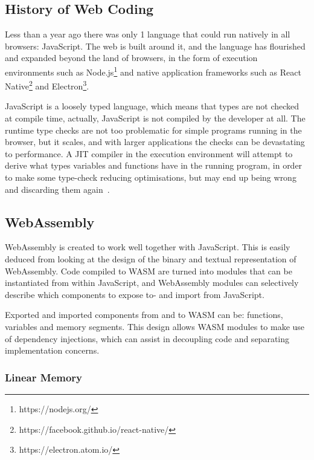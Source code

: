 \documentclass[a4paper]{article}
\begin{document}

\subsection{History of Web Coding}
\label{sec:problem-analysis:history}
Less than a year ago there was only 1 language that could run natively in all browsers: JavaScript. The web is built around it, and the language has flourished and expanded beyond the land of browsers, in the form of execution environments such as Node.js\footnote{https://nodejs.org/} and native application frameworks such as React Native\footnote{https://facebook.github.io/react-native/} and Electron\footnote{https://electron.atom.io/}.

JavaScript is a loosely typed language, which means that types are not checked at compile time, actually, JavaScript is not compiled by the developer at all. The runtime type checks are not too problematic for simple programs running in the browser, but it scales, and with larger applications the checks can be devastating to performance. A JIT compiler in the execution environment will attempt to derive what types variables and functions have in the running program, in order to make some type-check reducing optimisations, but may end up being wrong and discarding them again~\cite{video:thompson-js-perf-v8-and-wasm}. %

\subsection{WebAssembly}
\label{sec:problem-analysis:webassembly}
WebAssembly is created to work well together with JavaScript. This is easily deduced from looking at the design of the binary and textual representation of WebAssembly. Code compiled to WASM are turned into modules that can be instantiated from within JavaScript, and WebAssembly modules can selectively describe which components to expose to- and import from JavaScript.

Exported and imported components from and to WASM can be: functions, variables and memory segments. This design allows WASM modules to make use of dependency injections, which can assist in decoupling code and separating implementation concerns.

\subsubsection{Linear Memory}
\label{sec:problem-analysis-webassembly:linear-memory}
\end{document}
